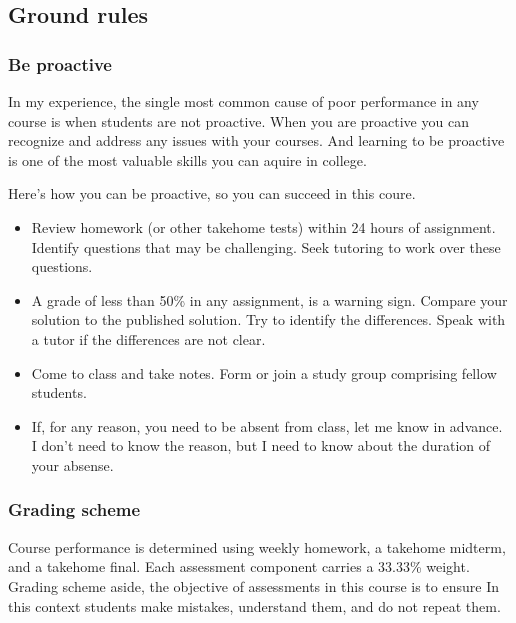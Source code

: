 \documentclass[letterpaper,10pt,english]{sphinxmanual}
\begin{document}
\subsection{Ground rules}
\label{\detokenize{COMP180/organization:ground-rules}}

\subsubsection{Be proactive}
\label{\detokenize{COMP180/organization:be-proactive}}
In my experience, the single most common cause of poor performance in any course is when students are not proactive. When you are proactive you can recognize and address any issues with your courses. And learning to be proactive is one of the most valuable skills you can aquire in college.

Here’s how you can be proactive, so you can succeed in this coure.
\begin{itemize}
\item {} 
Review homework (or other take\sphinxhyphen{}home tests) within 24 hours of assignment. Identify questions that may be challenging. Seek tutoring to work over these questions. 

\item {} 
A grade of less than 50\% in any assignment, is a warning sign. Compare your solution to the published solution. Try to identify the differences. Speak with a tutor if the differences are not clear.

\item {} 
Come to class and take notes. Form or join a study group comprising fellow students.

\item {} 
If, for any reason, you need to be absent from class, let me know in advance. I don’t need to know the reason, but I need to know about the duration of your absense.

\end{itemize}


\subsubsection{Grading scheme}
\label{\detokenize{COMP180/organization:grading-scheme}}
Course performance is determined using weekly homework, a take\sphinxhyphen{}home midterm, and a take\sphinxhyphen{}home final. Each assessment component carries a 33.33\% weight. Grading scheme aside, the objective of assessments in this course is to ensure  In this context students make mistakes, understand them, and do not repeat them.
\end{document}
